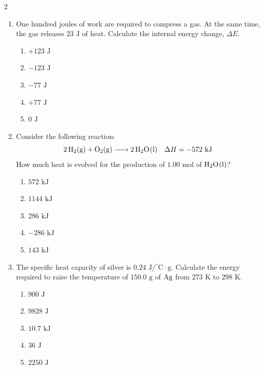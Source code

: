 \documentclass[12pt,letterpaper]{article}
\begin{document}
\begin{multicols*}{2}
\begin{enumerate}
        \item One hundred joules of work are required to compress a gas. At the same time, the gas releases $23\text{ J}$ of heat. Calculate the internal energy change, $\Delta E$. %
            \begin{enumerate}
                \item $+123\text{ J}$
                \item $-123\text{ J}$
                \item $-77\text{ J}$
                \item $+77\text{ J}$
                \item $0\text{ J}$
            \end{enumerate}
        \columnbreak
        \item Consider the following reaction:
            \begin{equation*}
                \ce{2H2(g) + O2(g) -> 2H2O(l)} \quad \Delta H = -572\text{ kJ}
            \end{equation*}
            How much heat is evolved for the production of $1.00\text{ mol}$ of $\ce{H2O(l)}$? %
            \begin{enumerate}
                \item $572\text{ kJ}$
                \item $1144\text{ kJ}$
                \item $286\text{ kJ}$
                \item $-286\text{ kJ}$
                \item $143\text{ kJ}$
            \end{enumerate}

        \item The specific heat capacity of silver is $0.24\text{ J/}^\circ\text{C}\cdot\text{g}$. Calculate the energy required to raise the temperature of $150.0\text{ g}$ of $\ce{Ag}$ from $273\text{ K}$ to $298\text{ K}$. %
            \begin{enumerate}
                \item $900\text{ J}$
                \item $9828\text{ J}$
                \item $10.7\text{ kJ}$
                \item $36\text{ J}$
                \item $2250\text{ J}$
            \end{enumerate}


\end{enumerate}
\end{multicols*}
\end{document}
